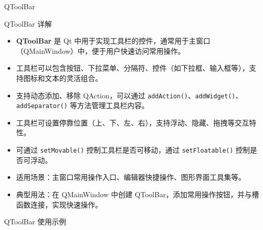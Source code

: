 \documentclass[UTF8,aspectratio=169]{beamer}
\begin{document}
\begin{frame}{QToolBar}
    \begin{ytublock}{QToolBar 详解}
        \begin{itemize}
            \item \textbf{QToolBar} 是 Qt 中用于实现工具栏的控件，通常用于主窗口（QMainWindow）中，便于用户快速访问常用操作。
            \item 工具栏可以包含按钮、下拉菜单、分隔符、控件（如下拉框、输入框等），支持图标和文本的灵活组合。
            \item 支持动态添加、移除 QAction，可以通过 \texttt{addAction()}、\texttt{addWidget()}、\texttt{addSeparator()} 等方法管理工具栏内容。
            \item 工具栏可设置停靠位置（上、下、左、右），支持浮动、隐藏、拖拽等交互特性。
            \item 可通过 \texttt{setMovable()} 控制工具栏是否可移动，通过 \texttt{setFloatable()} 控制是否可浮动。
            \item 适用场景：主窗口常用操作入口、编辑器快捷操作、图形界面工具集等。
            \item 典型用法：在 QMainWindow 中创建 QToolBar，添加常用操作按钮，并与槽函数连接，实现快速操作。
        \end{itemize}
    \end{ytublock}
\end{frame}

\begin{frame}[fragile]{QToolBar 使用示例}
    \begin{columns}
        \begin{column}{0.48\textwidth}
            \inputminted[firstline=1,lastline=18]{cpp}{code/qt_toolbar_example.cpp}
        \end{column}
        \begin{column}{0.48\textwidth}
            \inputminted[firstline=19,lastline=33]{cpp}{code/qt_toolbar_example.cpp}
        \end{column}
    \end{columns}
\end{frame}
\end{document}
